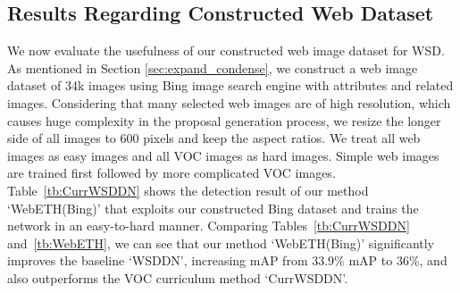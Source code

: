 \documentclass[10pt,twocolumn,letterpaper]{article}
\begin{document}
\subsection{Results Regarding Constructed Web Dataset}
We now evaluate the usefulness of our constructed web image dataset for WSD. 
As mentioned in Section \ref{sec:expand_condense}, we construct a web image dataset of 34k images using Bing image search engine with attributes and related images. Considering that many selected web images are of high resolution, which causes huge complexity in the proposal generation process, we resize the longer side of all images to 600 pixels and keep the aspect ratios. 
We treat all web images as easy images and all VOC images as hard images. Simple web images are trained first followed by more complicated VOC images. Table~\ref{tb:CurrWSDDN} shows the detection result of our method `WebETH(Bing)' that exploits our constructed Bing dataset and trains the network in an easy-to-hard manner. Comparing Tables~\ref{tb:CurrWSDDN} and~\ref{tb:WebETH}, we can see that our method `WebETH(Bing)' significantly improves the baseline `WSDDN', increasing mAP from 33.9\% mAP to 36\%, and also outperforms the VOC curriculum method `CurrWSDDN'.
\end{document}
